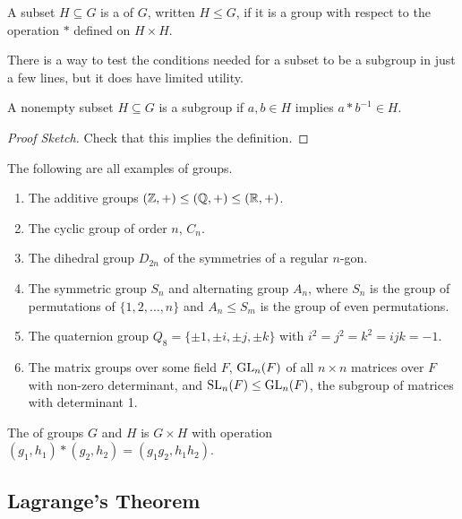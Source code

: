 \documentclass[a4paper]{scrartcl}
\begin{document}
\begin{definition}[Subgroup]
	A subset $H \subseteq G$ is a  of $G$, written $H \leq G$, if it is a group with respect to the operation $*$ defined on $H \times H$.
\end{definition}

There is a way to test the conditions needed for a subset to be a subgroup in just a few lines, but it does have limited utility.

\begin{lemma}
A nonempty subset $H \subseteq G$ is a subgroup if $a, b \in H$ implies $a * b^{-1} \in H$.
\end{lemma}
\begin{proof}[Proof Sketch]
	Check that this implies the definition.
\end{proof}

\begin{example}
	The following are all examples of groups.
	\begin{enumerate}[label=(\roman*)]
		\item The additive groups $(\mathbb{Z}, +) \leq (\mathbb{Q}, +) \leq (\mathbb{R}, +)$.
		\item The cyclic group of order $n$, $C_n$.
		\item The dihedral group $D_{2n}$ of the symmetries of a regular $n$-gon.
		\item The symmetric group $S_n$ and alternating group $A_n$, where $S_n$ is the group of permutations of $\{1, 2, \dots, n\}$ and $A_n \leq S_m$ is the group of even permutations. 
		\item The quaternion group $Q_8 = \{\pm 1, \pm i, \pm j, \pm k \}$ with $i^2 = j^2 = k^2 = ijk = -1$.
		\item The matrix groups over some field $F$, $\operatorname{GL}_n(F)$ of all $n \times n$ matrices over $F$ with non-zero determinant, and $\operatorname{SL}_n(F) \leq \operatorname{GL}_n(F)$, the subgroup of matrices with determinant 1.
	\end{enumerate}
\end{example}

\begin{definition}
	The  of groups $G$ and $H$ is $G \times H$ with operation $(g_1, h_1) * (g_2, h_2) = (g_1 g_2, h_1 h_2)$. 
\end{definition}

\subsection{Lagrange's Theorem}
\end{document}
